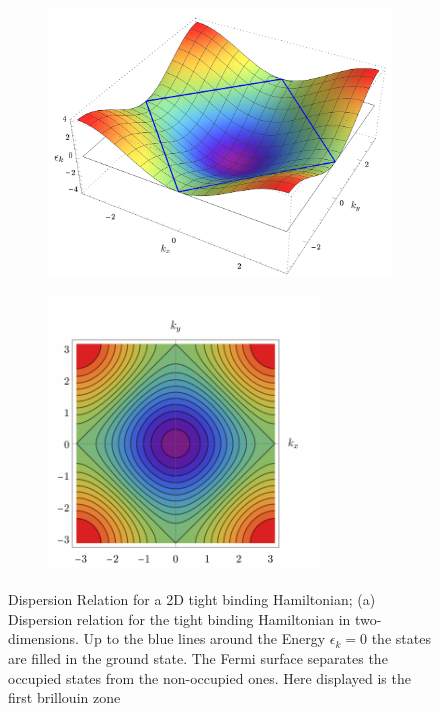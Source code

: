 \documentclass[11pt, a4paper]{article}
\theoremstyle{definition} %
\begin{document}
	\begin{figure}[h]
		\centering
		\begin{subfigure}[t]{0.49\textwidth}
		\centering
			\includegraphics[width =\textwidth]{Dispersion_relation2d}
			\caption{}
		\end{subfigure}
		\begin{subfigure}[t]{0.49\textwidth}
		\centering
			\includegraphics[width =0.8\textwidth]{Dispersion_Relation2d_Top}
			\caption{}
		\end{subfigure}
		\caption{Dispersion Relation for a 2D tight binding Hamiltonian; (a) Dispersion relation for the tight binding Hamiltonian in two-dimensions. Up to the blue lines around the Energy $\epsilon_k = 0$ the states are filled in the ground state. The Fermi surface separates the occupied states from the non-occupied ones. Here displayed is the first brillouin zone}
	\end{figure}
\end{document}

